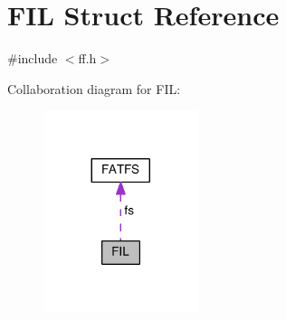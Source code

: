 \hypertarget{structFIL}{\section{F\-I\-L Struct Reference}
\label{structFIL}
}


{\ttfamily \#include $<$ff.\-h$>$}



Collaboration diagram for F\-I\-L\-:\nopagebreak
\begin{figure}[H]
\begin{center}
\leavevmode
\includegraphics[width=128pt]{structFIL__coll__graph}
\end{center}
\end{figure}

